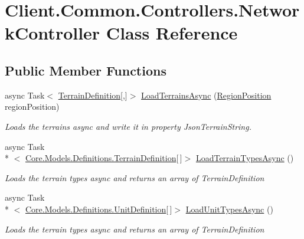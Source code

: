 \hypertarget{classClient_1_1Common_1_1Controllers_1_1NetworkController}{\section{Client.\-Common.\-Controllers.\-Network\-Controller Class Reference}
\label{classClient_1_1Common_1_1Controllers_1_1NetworkController}
}
\subsection*{Public Member Functions}
\begin{DoxyCompactItemize}
\item 
async Task$<$ \hyperlink{classCore_1_1Models_1_1Definitions_1_1TerrainDefinition}{Terrain\-Definition}\mbox{[},\mbox{]}$>$ \hyperlink{classClient_1_1Common_1_1Controllers_1_1NetworkController_a5d45a3e5a8fcf0a755954d782af4e780}{Load\-Terrains\-Async} (\hyperlink{classCore_1_1Models_1_1RegionPosition}{Region\-Position} region\-Position)
\begin{DoxyCompactList}\small\item\em Loads the terrains async and write it in property Json\-Terrain\-String. \end{DoxyCompactList}\item 
async Task\\*
$<$ \hyperlink{classCore_1_1Models_1_1Definitions_1_1TerrainDefinition}{Core.\-Models.\-Definitions.\-Terrain\-Definition}\mbox{[}$\,$\mbox{]}$>$ \hyperlink{classClient_1_1Common_1_1Controllers_1_1NetworkController_a6e0ad22bc63585d4be358da45848063d}{Load\-Terrain\-Types\-Async} ()
\begin{DoxyCompactList}\small\item\em Loads the terrain types async and returns an array of Terrain\-Definition \end{DoxyCompactList}\item 
async Task\\*
$<$ \hyperlink{classCore_1_1Models_1_1Definitions_1_1UnitDefinition}{Core.\-Models.\-Definitions.\-Unit\-Definition}\mbox{[}$\,$\mbox{]}$>$ \hyperlink{classClient_1_1Common_1_1Controllers_1_1NetworkController_ab2e121298834c77bed8e204928fc21ff}{Load\-Unit\-Types\-Async} ()
\begin{DoxyCompactList}\small\item\em Loads the terrain types async and returns an array of Terrain\-Definition \end{DoxyCompactList}\item 

\end{DoxyCompactItemize}
